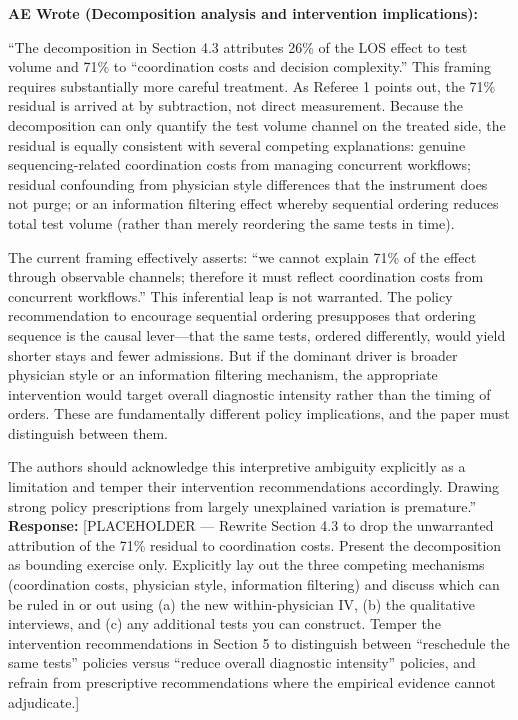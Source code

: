 \documentclass[11pt]{article}
\newenvironment{quote2}
{ \bigskip
\noindent
         \small\em
         \baselineskip=14pt
}
\newcommand{\1}{\hbox{\rm 1\kern-.35em 1}}
\begin{document}
\begin{quote2}
\textbf{AE Wrote (Decomposition analysis and intervention implications):}

\noindent ``The decomposition in Section 4.3 attributes 26\% of the LOS effect to test volume and 71\% to ``coordination costs and decision complexity.'' This framing requires substantially more careful treatment. As Referee 1 points out, the 71\% residual is arrived at by subtraction, not direct measurement. Because the decomposition can only quantify the test volume channel on the treated side, the residual is equally consistent with several competing explanations: genuine sequencing-related coordination costs from managing concurrent workflows; residual confounding from physician style differences that the instrument does not purge; or an information filtering effect whereby sequential ordering reduces total test volume (rather than merely reordering the same tests in time).

The current framing effectively asserts: ``we cannot explain 71\% of the effect through observable channels; therefore it must reflect coordination costs from concurrent workflows.'' This inferential leap is not warranted. The policy recommendation to encourage sequential ordering presupposes that ordering sequence is the causal lever---that the same tests, ordered differently, would yield shorter stays and fewer admissions. But if the dominant driver is broader physician style or an information filtering mechanism, the appropriate intervention would target overall diagnostic intensity rather than the timing of orders. These are fundamentally different policy implications, and the paper must distinguish between them.

The authors should acknowledge this interpretive ambiguity explicitly as a limitation and temper their intervention recommendations accordingly. Drawing strong policy prescriptions from largely unexplained variation is premature.''
\end{quote2}

\noindent\textbf{Response:} \color{blue}[PLACEHOLDER --- Rewrite Section 4.3 to drop the unwarranted attribution of the 71\% residual to coordination costs. Present the decomposition as bounding exercise only. Explicitly lay out the three competing mechanisms (coordination costs, physician style, information filtering) and discuss which can be ruled in or out using (a) the new within-physician IV, (b) the qualitative interviews, and (c) any additional tests you can construct. Temper the intervention recommendations in Section 5 to distinguish between ``reschedule the same tests'' policies versus ``reduce overall diagnostic intensity'' policies, and refrain from prescriptive recommendations where the empirical evidence cannot adjudicate.]
\color{black}
\end{document}
